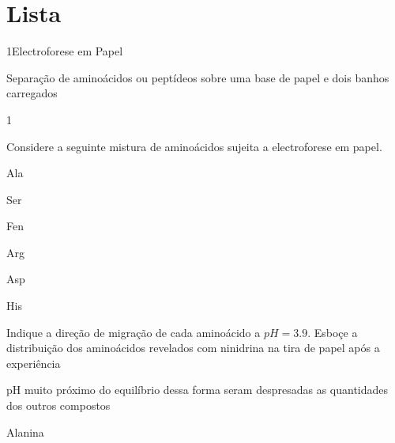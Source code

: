\documentclass[\mainfilename]{subfiles}
\begin{document}
\setcounter{list}{2}
\setcounter{question}{0}
\part*{Lista }

\begin{sectionBox}1{Electroforese em Papel}
    
    Separação de aminoácidos ou peptídeos sobre uma base de papel e dois banhos carregados
    
\end{sectionBox}

\begin{questionBox}1{}
    
    Considere a seguinte mistura de aminoácidos sujeita a electroforese em papel.

    \begin{questionBox}{}
        \begin{itemize}
            \begin{multicols}{3}
                \item Ala
                \item Ser
                \item Fen
                \item Arg
                \item Asp
                \item His
            \end{multicols}
        \end{itemize}
    \end{questionBox}

    Indique a direção de migração de cada aminoácido a \(pH = 3.9\).
    Esboçe a distribuição dos aminoácidos revelados com ninidrina na tira de papel após a experiência

    \vspace{2ex}
    
    pH muito próximo do equilíbrio  dessa forma seram despresadas as quantidades dos outros compostos

    \begin{enumerate}
        \begin{multicols}{2}
            \item Alanina
        \end{multicols}
    \end{enumerate}

\end{questionBox}
\end{document}
